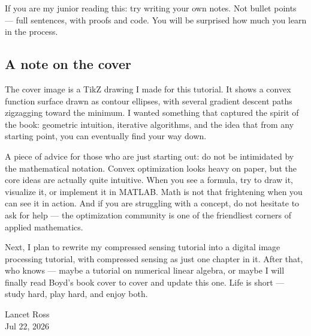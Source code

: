 \documentclass[lang=en,color=blue,mode=fancy,titlestyle=hang]{elegantbook}
\begin{document}
If you are my junior reading this: try writing your own notes. Not bullet points — full sentences,
with proofs and code. You will be surprised how much you learn in the process.

\subsection*{A note on the cover}

The cover image is a TikZ drawing I made for this tutorial. It shows a convex function surface
drawn as contour ellipses, with several gradient descent paths zigzagging toward the minimum.
I wanted something that captured the spirit of the book: geometric intuition, iterative algorithms,
and the idea that from any starting point, you can eventually find your way down.

A piece of advice for those who are just starting out: do not be intimidated by the mathematical
notation. Convex optimization looks heavy on paper, but the core ideas are actually quite intuitive.
When you see a formula, try to draw it, visualize it, or implement it in MATLAB. Math is not that
frightening when you can see it in action. And if you are struggling with a concept, do not hesitate
to ask for help — the optimization community is one of the friendliest corners of applied mathematics.

Next, I plan to rewrite my compressed sensing tutorial into a digital image processing tutorial,
with compressed sensing as just one chapter in it. After that, who knows — maybe a tutorial on
numerical linear algebra, or maybe I will finally read Boyd's book cover to cover and update this
one. Life is short — study hard, play hard, and enjoy both.

\begin{flushright}
  Lancet Ross\\
  Jul 22, 2026
\end{flushright}
\end{document}
